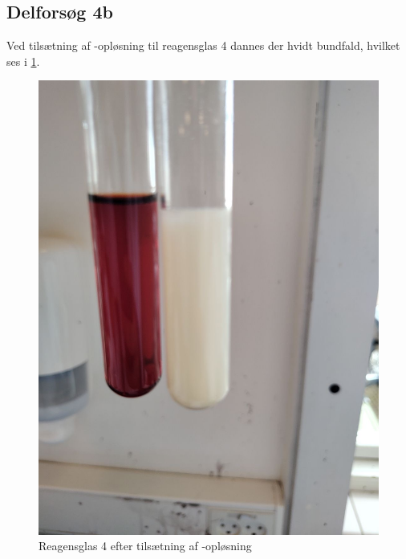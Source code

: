 \documentclass{report}
\begin{document}
\subsection*{Delforsøg 4b}
Ved tilsætning af -opløsning til reagensglas 4 dannes der hvidt bundfald, hvilket ses i \cref{fig:for4b}.
\begin{figure}[H]
\begin{center}
  \includegraphics[scale=0.2]{for4b.jpeg}
\end{center}
\caption{Reagensglas 4 efter tilsætning af -opløsning}
\label{fig:for4b}
\end{figure}
\end{document}
